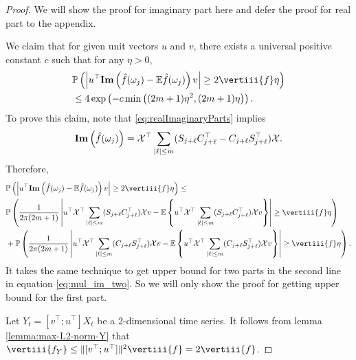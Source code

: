\begin{proof}
We will show the proof for imaginary part here and defer the proof for real part to  the appendix. \par  
We claim that 
for given unit vectors $u$ and $v$, there exists a universal positive constant $c$ such that for any $\eta > 0$,
\begin{equation}
\begin{aligned}
& \mathbb{P}\left(\left|u^\top \mathrm{\bf{Im}}\left(\hat{f}(\omega_j) - \mathbb{E}\hat{f}(\omega_j)\right)v\right|\ge 2\vertiii{f}\eta \right) \\
& \le 4\exp \left( - c\min \left((2m+1)\eta^2,(2m+1)\eta \right) \right).
\end{aligned}
\end{equation}
To prove this claim, note that \eqref{eq:realImaginaryParts} implies
\begin{equation}
\mathrm{\bf{Im}}\left(\hat{f}(\omega_j)\right) = \mathcal{X}^\top\sum_{|\ell|\le m}(S_{j+\ell}C_{j+\ell}^\top - C_{j+\ell}S_{j+\ell}^\top)\mathcal{X} .
\end{equation}
Therefore,  
\begin{equation}
\label{eq:mul_im_two}
\begin{aligned}
&\mathbb{P}\left(\left|u^\top \mathrm{\bf{Im}}\left(\hat{f}(\omega_j) - \mathbb{E}\hat{f}(\omega_j)\right)v\right|\ge 2\vertiii{f} \eta \right) \le \\
&\mathbb{P}\left(\frac{1}{2\pi(2m+1)}\left|u^\top \mathcal{X}^\top\sum_{|\ell|\le m}(S_{j+\ell}C_{j+\ell}^\top)\mathcal{X}  v - \mathbb{E}\left\{u^\top \mathcal{X}^\top\sum_{|\ell|\le m}(S_{j+\ell}C_{j+\ell}^\top)\mathcal{X}  v\right\}\right|\ge \vertiii{f} \eta \right) \\
&+\mathbb{P}\left(\frac{1}{2\pi(2m+1)}\left|u^\top \mathcal{X}^\top\sum_{|\ell|\le m}(C_{j+\ell}S_{j+\ell}^\top)\mathcal{X}  v - \mathbb{E}\left\{ u^\top \mathcal{X}^\top\sum_{|\ell|\le m}(C_{j+\ell}S_{j+\ell}^\top)\mathcal{X}  v\right\}\right|\ge \vertiii{f} \eta \right).
\end{aligned}
\end{equation}
It takes the same technique to get upper bound for two parts in the second line in equation \eqref{eq:mul_im_two}. So we will only show the proof for getting upper bound for the first part. \par 
Let $Y_t = [v^\top ; u^\top ]X_t$ be a 2-dimensional time series. It follows from lemma \ref{lemma:max-L2-norm-Y} that $\vertiii{f_Y}\le \|[v^\top; u^\top]\|^2 \vertiii{f} = 2\vertiii{f}$. \par 

\end{proof}
